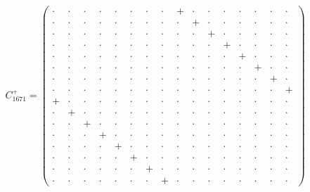 \documentclass[
  10pt,
]{article}
\begin{document}
\[C^+_{1671}=\left(\begin{smallmatrix} \cdot & \cdot & \cdot & \cdot & \cdot & \cdot & \cdot & \cdot & + & \cdot & \cdot & \cdot & \cdot & \cdot & \cdot & \cdot \\ \cdot & \cdot & \cdot & \cdot & \cdot & \cdot & \cdot & \cdot & \cdot & + & \cdot & \cdot & \cdot & \cdot & \cdot & \cdot \\ \cdot & \cdot & \cdot & \cdot & \cdot & \cdot & \cdot & \cdot & \cdot & \cdot & + & \cdot & \cdot & \cdot & \cdot & \cdot \\ \cdot & \cdot & \cdot & \cdot & \cdot & \cdot & \cdot & \cdot & \cdot & \cdot & \cdot & + & \cdot & \cdot & \cdot & \cdot \\ \cdot & \cdot & \cdot & \cdot & \cdot & \cdot & \cdot & \cdot & \cdot & \cdot & \cdot & \cdot & + & \cdot & \cdot & \cdot \\ \cdot & \cdot & \cdot & \cdot & \cdot & \cdot & \cdot & \cdot & \cdot & \cdot & \cdot & \cdot & \cdot & + & \cdot & \cdot \\ \cdot & \cdot & \cdot & \cdot & \cdot & \cdot & \cdot & \cdot & \cdot & \cdot & \cdot & \cdot & \cdot & \cdot & + & \cdot \\ \cdot & \cdot & \cdot & \cdot & \cdot & \cdot & \cdot & \cdot & \cdot & \cdot & \cdot & \cdot & \cdot & \cdot & \cdot & + \\ + & \cdot & \cdot & \cdot & \cdot & \cdot & \cdot & \cdot & \cdot & \cdot & \cdot & \cdot & \cdot & \cdot & \cdot & \cdot \\ \cdot & + & \cdot & \cdot & \cdot & \cdot & \cdot & \cdot & \cdot & \cdot & \cdot & \cdot & \cdot & \cdot & \cdot & \cdot \\ \cdot & \cdot & + & \cdot & \cdot & \cdot & \cdot & \cdot & \cdot & \cdot & \cdot & \cdot & \cdot & \cdot & \cdot & \cdot \\ \cdot & \cdot & \cdot & + & \cdot & \cdot & \cdot & \cdot & \cdot & \cdot & \cdot & \cdot & \cdot & \cdot & \cdot & \cdot \\ \cdot & \cdot & \cdot & \cdot & + & \cdot & \cdot & \cdot & \cdot & \cdot & \cdot & \cdot & \cdot & \cdot & \cdot & \cdot \\ \cdot & \cdot & \cdot & \cdot & \cdot & + & \cdot & \cdot & \cdot & \cdot & \cdot & \cdot & \cdot & \cdot & \cdot & \cdot \\ \cdot & \cdot & \cdot & \cdot & \cdot & \cdot & + & \cdot & \cdot & \cdot & \cdot & \cdot & \cdot & \cdot & \cdot & \cdot \\ \cdot & \cdot & \cdot & \cdot & \cdot & \cdot & \cdot & + & \cdot & \cdot & \cdot & \cdot & \cdot & \cdot & \cdot & \cdot \end{smallmatrix}\right)\]
\end{document}
